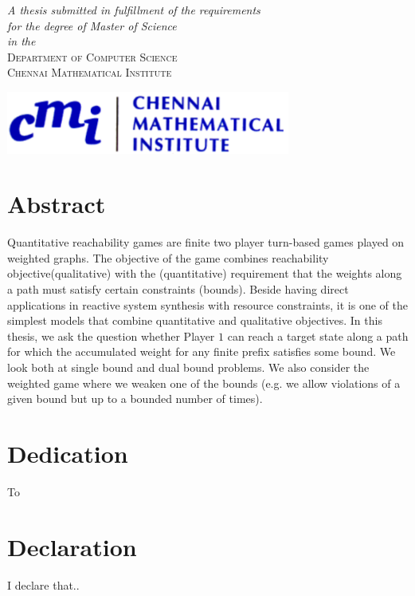 \documentclass[a4paper, 11pt, oneside]{book}
\theoremstyle{definition}
\begin{document}
\begin{titlepage}
	\textit{A thesis submitted in fulfillment of the requirements\\ for the degree of Master of Science}\\
	\vspace{1\baselineskip}
	\textit{in the}\\
	\vspace{1\baselineskip}
	{\scshape Department of Computer Science\\ Chennai Mathematical Institute}

	\vspace{4\baselineskip}
	
	\includegraphics[width=0.7\textwidth]{cmi.png}

	\vfill %
	
\end{titlepage}


\chapter*{Abstract}
Quantitative reachability games are finite two player turn-based games played on weighted graphs. The objective of the game combines reachability objective(qualitative) with the (quantitative) requirement that the weights along a path must satisfy certain constraints (bounds). Beside having direct applications in reactive system synthesis with resource constraints, it is one of the simplest models that combine quantitative and qualitative objectives. In this thesis, we ask the question whether Player $1$ can  reach a target state along a path for which the accumulated weight for any finite prefix satisfies some bound. We look both at single bound and dual bound problems. We also consider the weighted game where we weaken one of the bounds (e.g. we allow violations of a given bound but up to a bounded number of times).
 
\chapter*{Dedication}
To 
 
\chapter*{Declaration}
I declare that..
 
\end{document}
